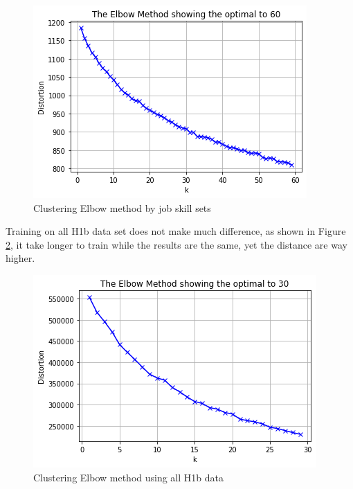 \begin{figure}[h]
	\begin{center}
		\includegraphics[width=\linewidth]{./photos/elbow.png}
	\end{center}
	\caption{Clustering Elbow method  by job skill sets}
	\label{elbow}
\end{figure}
Training on all H1b data set does not make much difference, as shown in Figure \ref{elbowbig}, it take longer to train while the results are the same, yet the distance are way higher. 
\begin{figure}[h]
	\begin{center}
		\includegraphics[width=\linewidth]{./photos/elbow for 2mil.png}
	\end{center}
	\caption{Clustering Elbow method using all H1b data}
	\label{elbowbig}
\end{figure}

